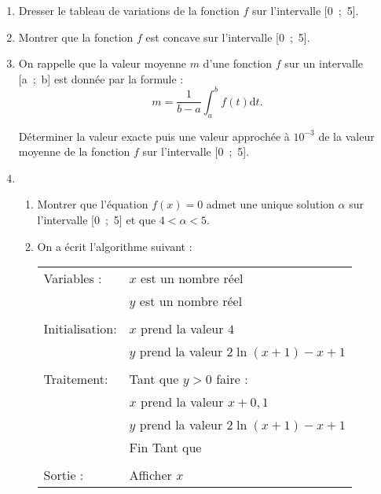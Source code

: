 \begin{enumerate}
     \item %
     Dresser le tableau de variations de la fonction $f$ sur l'intervalle [0~;~5].
     \item %
     Montrer que la fonction $f$ est concave sur l'intervalle [0~;~5].
     \item %
     On rappelle que la valeur moyenne $m$ d'une fonction $f$ sur un intervalle [a~;~b] est donnée par la formule :
     \[ m=\dfrac{1}{b-a}\displaystyle\int_{a}^{b}f(t)\text{d}t. \]
     \par
     Déterminer la valeur exacte puis une valeur approchée à $10^{-3}$ de la valeur moyenne de la fonction $f$ sur l'intervalle [0~;~5].
     \item %
     \begin{enumerate}[label=\alph*.]
          \item %
          Montrer que l'équation $f(x)=0$ admet une unique solution $\alpha$ sur l'intervalle [0~;~5] et que $4 < \alpha < 5$.
          \item %
          On a écrit l'algorithme suivant :
          \par
          \begin{center}
               \begin{extern}%
                    \begin{tabular}{|l|l|}\hline
                         Variables :	&$x$ est un nombre réel\\
                         &$y$ est un nombre réel\\
                         & \\
                         Initialisation: &$x$ prend la valeur $4$ \\
                         &$y$ prend la valeur $2\ln(x+1)-x+1$ \\
                         & \\
                         Traitement: &Tant que $y > 0$ faire : \\
                         &\quad$x$ prend la valeur $x+0,1$\\
                         &\quad$y$ prend la valeur $2\ln(x+1)-x+1$\\
                         &Fin Tant que\\
                         & \\
                         Sortie :	&Afficher $x$ \\
                         \hline

\end{tabular}
\end{extern}
\end{center}
\end{enumerate}
\end{enumerate}
